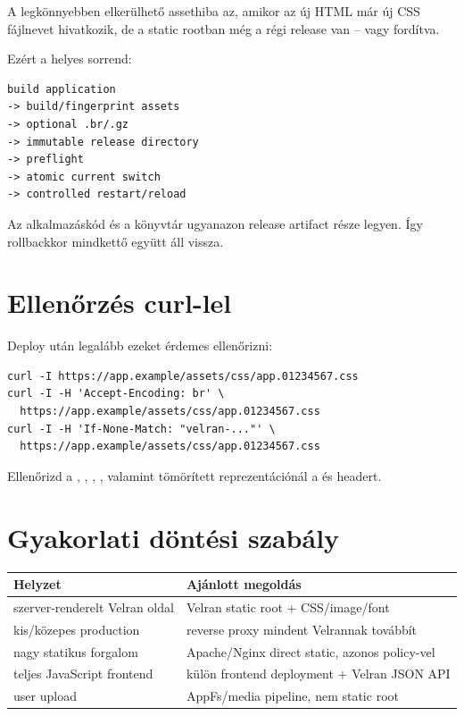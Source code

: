 A legkönnyebben elkerülhető assethiba az, amikor az új HTML már új CSS fájlnevet hivatkozik, de a static rootban még a régi release van -- vagy fordítva.

Ezért a helyes sorrend:

\begin{lstlisting}
build application
-> build/fingerprint assets
-> optional .br/.gz
-> immutable release directory
-> preflight
-> atomic current switch
-> controlled restart/reload
\end{lstlisting}

Az alkalmazáskód és a  könyvtár ugyanazon release artifact része legyen. Így rollbackkor mindkettő együtt áll vissza.

\section{Ellenőrzés curl-lel}

Deploy után legalább ezeket érdemes ellenőrizni:

\begin{lstlisting}
curl -I https://app.example/assets/css/app.01234567.css
curl -I -H 'Accept-Encoding: br' \
  https://app.example/assets/css/app.01234567.css
curl -I -H 'If-None-Match: "velran-..."' \
  https://app.example/assets/css/app.01234567.css
\end{lstlisting}

Ellenőrizd a , , , , valamint tömörített reprezentációnál a  és  headert.

\section{Gyakorlati döntési szabály}

\begin{center}
\begin{tabularx}{\textwidth}{@{}lY@{}}
\toprule
Helyzet & Ajánlott megoldás \\
\midrule
szerver-renderelt Velran oldal & Velran static root + CSS/image/font \\
kis/közepes production & reverse proxy mindent Velrannak továbbít \\
nagy statikus forgalom & Apache/Nginx direct static, azonos policy-vel \\
teljes JavaScript frontend & külön frontend deployment + Velran JSON API \\
user upload & AppFs/media pipeline, nem static root \\
\bottomrule
\end{tabularx}
\end{center}

